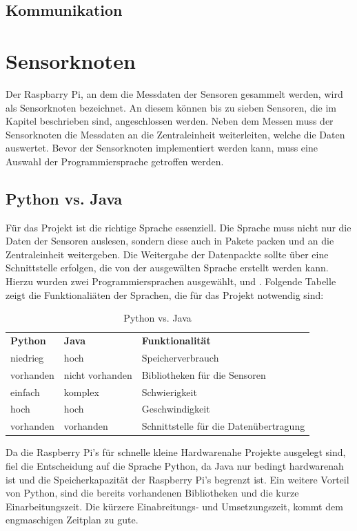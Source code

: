 \subsection{Kommunikation}

\section{Sensorknoten}
Der Raspbarry Pi, an dem die Messdaten der Sensoren gesammelt werden, wird als Sensorknoten bezeichnet. An diesem können bis zu sieben Sensoren, die im Kapitel  beschrieben sind, angeschlossen werden. Neben dem Messen muss der Sensorknoten die Messdaten an die Zentraleinheit weiterleiten, welche die Daten auswertet. Bevor der Sensorknoten implementiert werden kann, muss eine Auswahl der Programmiersprache getroffen werden.
\subsection{Python vs. Java}
Für das Projekt ist die richtige Sprache essenziell. Die Sprache muss nicht nur die Daten der Sensoren auslesen, sondern diese auch in Pakete packen und an die Zentraleinheit weitergeben. Die Weitergabe der Datenpackte sollte über eine Schnittstelle erfolgen, die von der ausgewälten Sprache erstellt werden kann. Hierzu wurden zwei Programmiersprachen ausgewählt,  und . Folgende Tabelle zeigt die Funktionaliäten der Sprachen, die für das Projekt notwendig sind:\hfill

\begin{table}[h]
	\centering
	\caption{Python vs. Java}
	\label{my-label}
	\begin{tabular}{lll}
	\textbf{Python} & \textbf{Java} & \textbf{Funktionalität}  \\
	niedrieg & hoch &  Speicherverbrauch\\
	vorhanden & nicht vorhanden & Bibliotheken für die Sensoren \\
	einfach & komplex & Schwierigkeit \\
	hoch & hoch & Geschwindigkeit \\
	vorhanden & vorhanden & Schnittstelle für die Datenübertragung
	\end{tabular}
\end{table}
\noindent Da die Raspberry Pi's für schnelle kleine Hardwarenahe Projekte ausgelegt sind, fiel die Entscheidung auf die Sprache Python, da Java nur bedingt hardwarenah ist und die Speicherkapazität der Raspberry Pi's begrenzt ist. Ein weitere Vorteil von Python, sind die bereits vorhandenen Bibliotheken und die kurze Einarbeitungszeit. Die kürzere Einabreitungs- und Umsetzungszeit, kommt dem engmaschigen Zeitplan zu gute.

